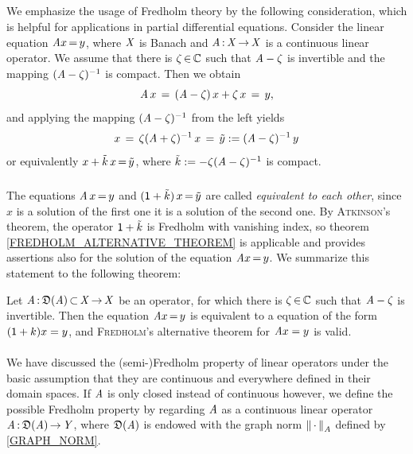 \documentclass[11pt,twoside]{article}
\begin{document}
\subparagraph*{} %
We emphasize the usage of Fredholm theory by the following consideration,
which is helpful for applications in partial differential equations.
Consider the linear equation $\mathit{A} x {\,=\,} y$,
where $\mathit{X}$ is Banach
and $\mathit{A} {\,:\,} \mathit{X} {\,\to\,} \mathit{X}$ is a continuous linear operator.
We assume that there is $\zeta {\,\in\,} {\mathbb{C}}$
such that
$\mathit{A} - \zeta$ is invertible and the mapping $(\mathit{A} - \zeta)^{-1}$ is compact.
Then we obtain
\[
\mathit{A} \,x \,=\, (\mathit{A} -\zeta)\,x + \zeta \,x \,=\, y,
\]
and applying the mapping $(\mathit{A} -\zeta)^{-1}$ from the left yields
\[
x \,=\, \zeta (\mathit{A} + \zeta)^{-1}\,x \,=\, \tilde{y} := (\mathit{A} -\zeta)^{-1}\,y
\]
or equivalently $x + \tilde{k} \,x {\,=\,} \tilde{y}$,
where $\tilde{k} := - \zeta (\mathit{A}-\zeta)^{-1}$ is compact.

\subparagraph*{}
The equations $\mathit{A} \,x {\,=\,} y$ and $({\mathsf{1}} + \tilde{k})\,x {\,=\,} \tilde{y}$
are called \textit{equivalent to each other},
since $x$ is a solution of the first one
\iff
it is a solution of the second one.
By \textsc{Atkinson}'s theorem,
the operator ${\mathsf{1}} + \tilde{k}$ is Fredholm with vanishing index,
so theorem \ref{FREDHOLM_ALTERNATIVE_THEOREM} is applicable
and provides assertions also for the solution of the equation $\mathit{A} x {\,=\,} y$.
We summarize this statement to the following theorem:

\begin{theorem}\label{FREDHOLM_ALTERNATIVE_THEOREM_II}
Let $\mathit{A} {\,:\,} \mathfrak{D}(\mathit{A}) {\,\subset\,} \mathit{X} {\,\to\,} \mathit{X}$ be an operator,
for which there is $\zeta {\,\in\,} {\mathbb{C}}$ such that $\mathit{A} -\zeta$ is invertible.
Then the equation $\mathit{A} x {\,=\,} y$ is equivalent to a equation
of the form $({\mathsf{1}}+k)x=y$,
and \textsc{Fredholm}'s alternative theorem for $\mathit{A} x=y$ is valid.
\end{theorem}

\paragraph*{} %
We have discussed the (semi-)Fredholm property of linear operators
under the basic assumption
that they are continuous and everywhere defined in their domain spaces.
If $\mathit{A}$ is only closed instead of continuous
however,
we define the possible Fredholm property by regarding
$\mathit{A}$ as a continuous linear operator $\mathit{A} {\,:\,} \mathfrak{D}(\mathit{A}) {\,\to\,} \mathit{Y}$,
where $\mathfrak{D}(\mathit{A})$ is endowed
with the graph norm $\left\lVert \,\cdot\, \right\rVert_{\mathit{A}}$ defined by \eqref{GRAPH_NORM}.
\end{document}
